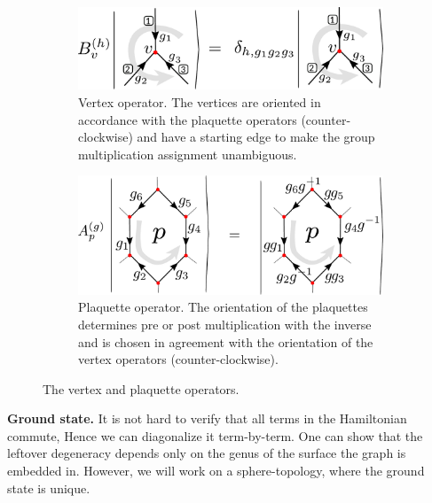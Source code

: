 \documentclass[two column]{article}
\begin{document}
\begin{figure}
    \centering
    \begin{subfigure}[b]{0.45\textwidth}
        \centering
        \includegraphics[width= \linewidth]{Figures/B_ops.pdf}
        \caption{Vertex operator. The vertices are oriented in accordance with the plaquette operators (counter-clockwise) and have a starting edge to make the group multiplication assignment unambiguous.}
        \label{eqn:Bs_def}
    \end{subfigure}\hfill
    \begin{subfigure}[b]{0.45\textwidth}
        \centering
        \includegraphics[width = \linewidth]{Figures/A_ops.pdf}
        \caption{Plaquette operator. The orientation of the plaquettes determines pre or post multiplication with the inverse and is chosen in agreement with the orientation of the vertex operators (counter-clockwise).}
        \label{eqn:As_def}
    \end{subfigure}\hfill
    \caption{The vertex and plaquette operators.}
    \label{fig:vertex_ops}
\end{figure}

\textbf{Ground state.}
It is not hard to verify that all terms in the Hamiltonian commute, Hence we can diagonalize it term-by-term. One can show that the leftover degeneracy depends only on the genus of the surface the graph is embedded in\cite{Kitaev_2003, cui2018topological}. However, we will work on a sphere-topology, where the ground state is unique.


\end{document}
